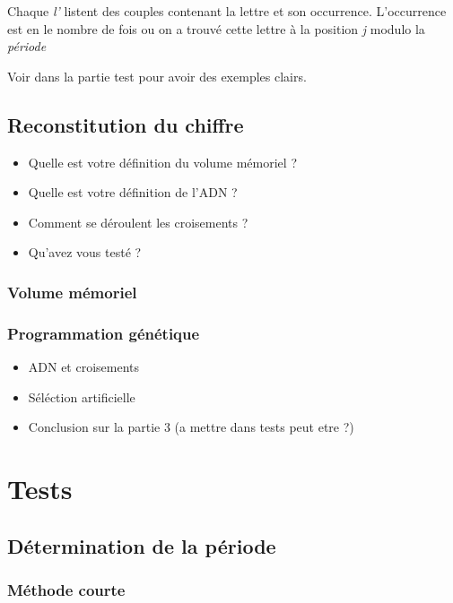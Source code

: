 \documentclass[a4paper, 11pt]{article}
\begin{document}
Chaque \textit{l'} listent des couples contenant la lettre et son
occurrence. L'occurrence est en le nombre de fois ou on a trouvé cette
lettre à la position \textit{j} modulo la \textit{période}

Voir dans la partie test pour avoir des exemples clairs.



\subsection{Reconstitution du chiffre}

\begin{itemize}
\item Quelle est votre définition du volume mémoriel ?
\item Quelle est votre définition de l'ADN ?
\item Comment se déroulent les croisements ?
\item Qu'avez vous testé ?
\end{itemize}


\subsubsection{Volume mémoriel}
\subsubsection{Programmation génétique}
\begin{itemize}
\item ADN et croisements
\item Séléction artificielle
\item Conclusion sur la partie 3 (a mettre dans tests peut etre ?)
\end{itemize}



\section{Tests}

\subsection{Détermination de la période}

\subsubsection{Méthode courte}
\end{document}
